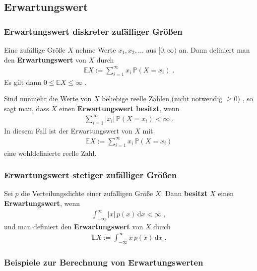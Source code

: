 \documentclass[ngerman,draft,parskip=half,twoside]{scrartcl}
\newcommand*{\E}{\mathbb{E}}        %
\newcommand*{\WKM}{\mathbb{P}}      %
\begin{document}
\subsection{Erwartungswert}
\subsubsection{Erwartungswert diskreter zufälliger Größen}
Eine zufällige Größe $X$ nehme Werte $x_1,x_2,\ldots$ aus $[0,\infty)$ an. Dann
definiert man den \textbf{Erwartungswert} von $X$ durch
\begin{gather*}
  \E X :=\sum_{i=1}^\infty x_i\,\WKM(X=x_i)\;.
\end{gather*}
Es gilt dann $0\le \E X \le \infty$ .

Sind nunmehr die Werte von $X$ beliebige reelle Zahlen (nicht notwendig $\ge 0$)
, so sagt man, dass $X$ einen \textbf{Erwartungswert
besitzt}, wenn
\begin{gather*}
  \sum_{i=1}^\infty |x_i|\,\WKM(X=x_i)<\infty\;.
\end{gather*}
In diesem Fall ist der Erwartungswert von $X$ mit
\begin{gather*}
  \E X :=\sum_{i=1}^\infty x_i\,\WKM(X=x_i)
\end{gather*}
eine wohldefinierte reelle Zahl.

\subsubsection{Erwartungswert stetiger zufälliger Größen}
Sei $p$ die Verteilungsdichte einer zufälligen Größe $X$. Dann \textbf{besitzt} $X$ einen
\textbf{Erwartungswert}, wenn
\begin{gather*}
  \int_{-\infty}^\infty |x|\,p(x)\,\mathrm   d x <\infty\;,
\end{gather*}
und man definiert den \textbf{Erwartungswert} von $X$ durch
\begin{gather*}
  \E X := \int_{-\infty}^\infty x \,p(x)\,\mathrm   d x\;.
\end{gather*}
\subsubsection{Beispiele zur Berechnung von Erwartungswerten}
\medskip
\end{document}
